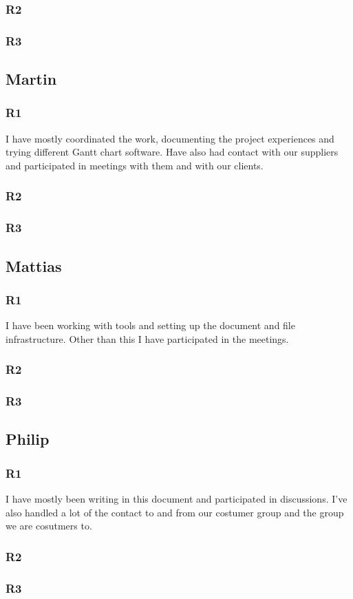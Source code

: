 \documentclass[a4paper]{article}
\begin{document}
    \subsubsection{R2}
    \subsubsection{R3}
  
  \subsection{Martin}
    \subsubsection{R1}
    I have mostly coordinated the work, documenting the project experiences and trying different Gantt chart software. Have also had contact with our suppliers and participated in meetings with them and with our clients.
    \subsubsection{R2}
    \subsubsection{R3}
  
  \subsection{Mattias}
    \subsubsection{R1}
    I have been working with tools and setting up the document and file infrastructure. Other than this I have participated in the meetings.
    \subsubsection{R2}
    \subsubsection{R3}
  \subsection{Philip}
    \subsubsection{R1}
  I have mostly been writing in this document and participated in discussions. I've also handled a lot of the contact to and from our costumer group and the group we are cosutmers to.
    \subsubsection{R2}
    \subsubsection{R3}
\end{document}
